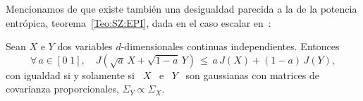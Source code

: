 
\label{Ssec:SZ:FisherConvolucional}




Mencionamos de que existe tambi\'en una desigualdad parecida a la de la potencia
entr\'opica,  teorema~\ref{Teo:SZ:EPI}, dada en  el caso  escalar en~\cite{Joh04,
  Bla65, Zam98, DemCov91, KagYu08}:
%
\begin{teorema}
\label{Teo:SZ:DesigualdadConvolucionalFisher}
%
Sean  $X$  e  $Y$  dos  variables  $d$-dimensionales  continuas  independientes.
Entonces
  \[
  \forall \, a \in [0 \;  1], \quad J\left( \sqrt{a} \, X + \sqrt{1-a} \, Y
  \right) \, \le \, a \, J(X) + (1-a) \, J(Y),
  \]
  con igualdad si y  solamente si \ $X$ \ e \ $Y$  \ son gaussianas con matrices
  de covarianza proporcionales, $\Sigma_Y \propto \Sigma_X$.
\end{teorema}
%
